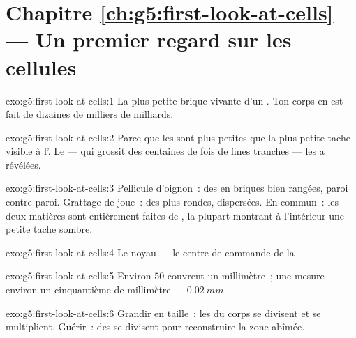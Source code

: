 \section*{Chapitre \ref{ch:g5:first-look-at-cells} --- Un premier regard sur les cellules}

\begin{solution}{exo:g5:first-look-at-cells:1}
La plus petite brique vivante d'un . Ton corps en est
fait de dizaines de milliers de milliards.
\end{solution}

\begin{solution}{exo:g5:first-look-at-cells:2}
Parce que les  sont plus petites que la plus petite tache
visible à l'. Le  --- qui grossit des centaines de fois
de fines tranches --- les a révélées.
\end{solution}

\begin{solution}{exo:g5:first-look-at-cells:3}
Pellicule d'oignon~: des  en briques bien rangées, paroi
contre paroi. Grattage de joue~: des  plus rondes,
dispersées. En commun~: les deux matières sont entièrement faites de
, la plupart montrant à l'intérieur une petite tache sombre.
\end{solution}

\begin{solution}{exo:g5:first-look-at-cells:4}
Le noyau --- le centre de commande de la .
\end{solution}

\begin{solution}{exo:g5:first-look-at-cells:5}
Environ $50$  couvrent un millimètre~; une  mesure
environ un cinquantième de millimètre --- $\qty{0.02}{mm}$.
\end{solution}

\begin{solution}{exo:g5:first-look-at-cells:6}
Grandir en taille~: les  du corps se divisent et se
multiplient. Guérir~: des  se divisent pour reconstruire la
zone abîmée.
\end{solution}


